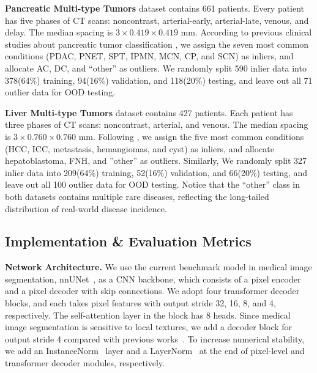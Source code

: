 \documentclass[10pt,twocolumn,letterpaper]{article}
\begin{document}
{\bf Pancreatic Multi-type Tumors} dataset contains 661 patients. Every patient has five phases of CT scans: noncontrast, arterial-early, arterial-late, venous, and delay. The median spacing is $3 \times 0.419 \times 0.419$ mm. According to previous clinical studies about pancreatic tumor classification \cite{springer2019multimodality,chu2022classification}, we assign the seven most common conditions (PDAC, PNET, SPT, IPMN, MCN, CP, and SCN) as inliers, and allocate AC, DC, and ``other'' as outliers. We randomly split 590 inlier data into 378(64\%) training, 94(16\%) validation, and 118(20\%) testing, and leave out all 71 outlier data for OOD testing.

{\bf Liver Multi-type Tumors } dataset contains 427 patients. Each patient has three phases of CT scans: noncontrast, arterial, and venous. The median spacing is $3 \times 0.760 \times 0.760$ mm. Following \cite{yasaka2018deep}, we assign the five most common conditions (HCC, ICC, metastasis, hemangiomas, and cyst) as inliers, and allocate hepatoblastoma, FNH, and ''other'' as outliers. Similarly, We randomly split 327 inlier data into 209(64\%) training, 52(16\%) validation, and 66(20\%) testing, and leave out all 100 outlier data for OOD testing. Notice that the ``other'' class in both datasets contains multiple rare diseases, reflecting the long-tailed distribution of real-world disease incidence.

\subsection{Implementation \& Evaluation Metrics}

{\bf Network Architecture.} We use the current benchmark model in medical image segmentation, nnUNet~\cite{isensee2021nnu}, as a CNN backbone, which consists of a pixel encoder and a pixel decoder with skip connections. We adopt four transformer decoder blocks, and each takes pixel features with output stride 32, 16, 8, and 4, respectively. The self-attention layer in the block has 8 heads. Since medical image segmentation is sensitive to local textures, we add a decoder block for output stride 4 compared with previous works~\cite{wang2021max,yu2022k}. To increase numerical stability, we add an InstanceNorm~\cite{ulyanov2016instance} layer and a LayerNorm~\cite{ba2016layer} at the end of pixel-level and transformer decoder modules, respectively.
\end{document}
